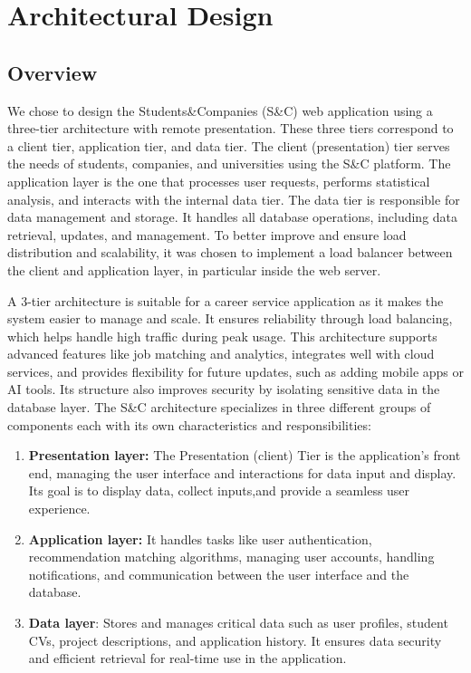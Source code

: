 \chapter{Architectural Design}

\section{Overview}
We chose to design the Students\&Companies (S\&C) web application using a three-tier architecture with remote presentation. These three tiers correspond to a client tier, application tier, and data tier. The client (presentation) tier serves the needs of students, companies, and universities using the S\&C platform. The application layer is the one that processes user requests, performs statistical analysis, and interacts with the internal data tier. The data tier is responsible for data management and storage. It handles all database operations, including data retrieval, updates, and management. To better improve and ensure load distribution and scalability, it was chosen to implement a load balancer between the client and application layer, in particular inside the web server.

A 3-tier architecture is suitable for a career service application as it makes the system easier to manage and scale. It ensures reliability through load balancing, which helps handle high traffic during peak usage. This architecture supports advanced features like job matching and analytics, integrates well with cloud services, and provides flexibility for future updates, such as adding mobile apps or AI tools. Its structure also improves security by isolating sensitive data in the database layer. The S\&C architecture specializes in three different groups of components each with its own characteristics and responsibilities:
\begin{enumerate}
    \item \textbf{Presentation layer:} The Presentation (client) Tier is the application's front end, managing the user interface and interactions for data input and display. Its goal is to display data, collect inputs,and provide a seamless user experience. 
    \item \textbf{Application layer:} It handles tasks like user authentication, recommendation matching algorithms, managing user accounts, handling notifications, and communication between the user interface and the database.
    \item \textbf{Data layer}: Stores and manages critical data such as user profiles, student CVs, project descriptions, and application history. It ensures data security and efficient retrieval for real-time use in the application.
\end{enumerate}

